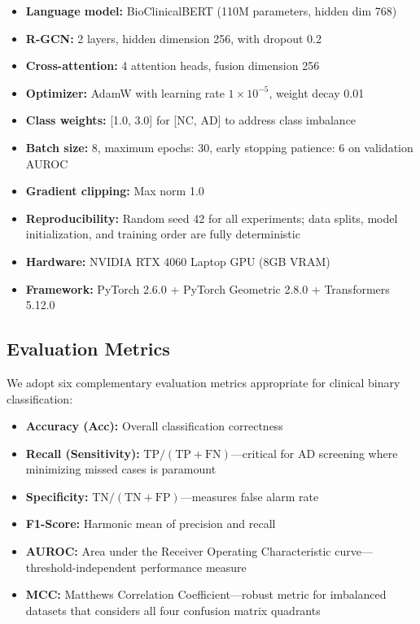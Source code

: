 \documentclass[11pt,onecolumn,a4paper]{article}
\begin{document}
\begin{itemize}[leftmargin=*]
    \item \textbf{Language model:} BioClinicalBERT (110M parameters, hidden dim 768)
    \item \textbf{R-GCN:} 2 layers, hidden dimension 256, with dropout 0.2
    \item \textbf{Cross-attention:} 4 attention heads, fusion dimension 256
    \item \textbf{Optimizer:} AdamW with learning rate $1 \times 10^{-5}$, weight decay 0.01
    \item \textbf{Class weights:} [1.0, 3.0] for [NC, AD] to address class imbalance
    \item \textbf{Batch size:} 8, maximum epochs: 30, early stopping patience: 6 on validation AUROC
    \item \textbf{Gradient clipping:} Max norm 1.0
    \item \textbf{Reproducibility:} Random seed 42 for all experiments; data splits, model initialization, and training order are fully deterministic
    \item \textbf{Hardware:} NVIDIA RTX 4060 Laptop GPU (8GB VRAM)
    \item \textbf{Framework:} PyTorch 2.6.0 + PyTorch Geometric 2.8.0 + Transformers 5.12.0
\end{itemize}

\subsection{Evaluation Metrics}

We adopt six complementary evaluation metrics appropriate for clinical binary classification:

\begin{itemize}[leftmargin=*]
    \item \textbf{Accuracy (Acc):} Overall classification correctness
    \item \textbf{Recall (Sensitivity):} $\text{TP} / (\text{TP} + \text{FN})$---critical for AD screening where minimizing missed cases is paramount
    \item \textbf{Specificity:} $\text{TN} / (\text{TN} + \text{FP})$---measures false alarm rate
    \item \textbf{F1-Score:} Harmonic mean of precision and recall
    \item \textbf{AUROC:} Area under the Receiver Operating Characteristic curve---threshold-independent performance measure
    \item \textbf{MCC:} Matthews Correlation Coefficient---robust metric for imbalanced datasets that considers all four confusion matrix quadrants
\end{itemize}
\end{document}
